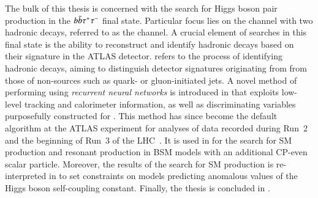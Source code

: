 The bulk of this thesis is concerned with the search for Higgs boson pair
production in the $b\bar{b}\tau^{+} \tau^{-}$ final state. Particular focus lies on the
channel with two hadronic \taulepton decays, referred to as the \hadhad channel.
A crucial element of searches in this final state is the ability to reconstruct
and identify hadronic \taulepton decays based on their signature in the ATLAS
detector. \emph{\Tauid} refers to the process of identifying hadronic \taulepton
decays, aiming to distinguish detector signatures originating from \tauhad from
those of non-\tauhad sources such as quark- or gluon-initiated jets. A novel
method of performing \tauid using \emph{recurrent neural networks} is introduced
in  that exploits low-level tracking and calorimeter
information, as well as discriminating variables purposefully constructed for
\tauid. This method has since become the default \tauid algorithm at the ATLAS
experiment for analyses of data recorded during Run~2 and the beginning of Run~3
of the LHC~\cite{ATL-PHYS-PUB-2019-033,ATL-PHYS-PUB-2022-044}. It is used in
 for the search for SM \HH production and resonant \HH
production in BSM models with an additional CP-even scalar particle. Moreover,
the results of the search for SM \HH production is re-interpreted in
 to set constraints on models predicting anomalous
values of the Higgs boson self-coupling constant. Finally, the thesis is
concluded in .







